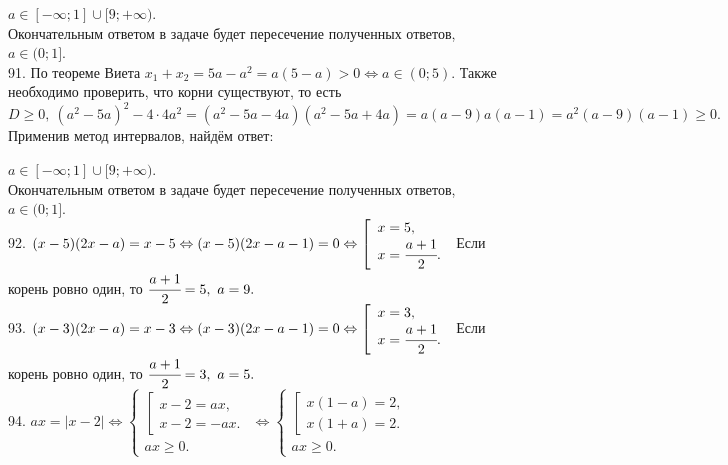 \documentclass[12pt]{article}
\begin{document}
$a\in[-\infty;1]\cup[9;+\infty).$\\ Окончательным ответом в задаче будет пересечение полученных ответов, $a\in (0;1].$\\
91. По теореме Виета $x_1+x_2=5a-a^2=a(5-a)>0\Leftrightarrow a\in(0;5).$ Также необходимо проверить, что корни существуют, то есть $D\geqslant0,\ (a^2-5a)^2-4\cdot4a^2=(a^2-5a-4a)(a^2-5a+4a)=a(a-9)a(a-1)=a^2(a-9)(a-1)\geqslant0.$ Применив метод интервалов, найдём ответ:
\begin{figure}[ht!]
\end{figure}
$a\in[-\infty;1]\cup[9;+\infty).$\\ Окончательным ответом в задаче будет пересечение полученных ответов, $a\in (0;1].$\\
92. $(x-5)(2x-a)=x-5\Leftrightarrow(x-5)(2x-a-1)=0\Leftrightarrow \left[\begin{array}{l}x=5,\\ x=\cfrac{a+1}{2}.\end{array}\right.$
Если корень ровно один, то $\cfrac{a+1}{2}=5,\ a=9.$\\
93. $(x-3)(2x-a)=x-3\Leftrightarrow(x-3)(2x-a-1)=0\Leftrightarrow \left[\begin{array}{l}x=3,\\ x=\cfrac{a+1}{2}.\end{array}\right.$
Если корень ровно один, то $\cfrac{a+1}{2}=3,\ a=5.$\\
94. $ax=|x-2|\Leftrightarrow \begin{cases}\left[\begin{array}{l}x-2=ax,\\ x-2=-ax.\end{array}\right.\\ ax\geqslant0.\end{cases}\Leftrightarrow
\begin{cases}\left[\begin{array}{l}x(1-a)=2,\\ x(1+a)=2.\end{array}\right.\\ ax\geqslant0.\end{cases}$
\end{document}
